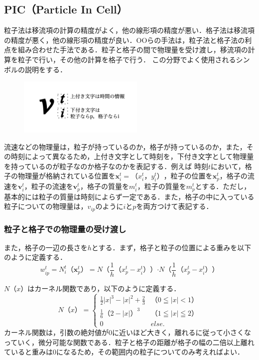 \documentclass[a4j,12pt]{jreport}
\begin{document}
\subsection{PIC（Particle In Cell）} \label{subsec:PIC}
粒子法は移流項の計算の精度がよく，他の線形項の精度が悪い．格子法は移流項の精度が悪く，他の線形項の精度が良い．OOらの手法は，粒子法と格子法の利点を組み合わせた手法である．粒子と格子の間で物理量を受け渡し，移流項の計算を粒子で行い，その他の計算を格子で行う．
この分野でよく使用されるシンボルの説明をする．
\begin{figure}[htbp]
\begin{center}
\includegraphics[width=60mm]{exp_simbol.png}
\end{center}
\end{figure}

流速などの物理量は，粒子が持っているのか，格子が持っているのか，また，その時刻によって異なるため，上付き文字として時刻を，下付き文字として物理量を持っているのが粒子なのか格子なのかを表記する．例えば
時刻$t$において，格子の物理量が格納されている位置を$\bm{x}^t_i = （x^t_i，y^t_i）$，粒子の位置を$\bm{x}^t_p$，格子の流速を$\bm{v}^t_i$，粒子の流速を$\bm{v}^t_p$，格子の質量を$m^t_i$，粒子の質量を$m^t_p$とする．ただし，基本的には粒子の質量は時刻によらず一定である．また，格子の中に入っている粒子についての物理量は，$v_{ip}$のように$iとp$を両方つけて表記する．
\subsubsection{粒子と格子での物理量の受け渡し} \label{subsec:P2GG2P}
また，格子の一辺の長さを$h$とする．まず，格子と粒子の位置による重みを以下のように定義する．
\begin{equation}\label{eq:weight}
w^t_{ip} = N^t_i（\bm{x}^t_p） = N（\frac{1}{h}（x^t_p - x^t_i））\boldsymbol{\cdot}N（\frac{1}{h}（x^t_p - x^t_i））
\end{equation} 

$N（x）$はカーネル関数であり，以下のように定義する．
\begin{equation}\label{eq:kernel}
N（x） = 
\begin{cases}
\frac{1}{2}|x|^3 - |x|^2 + \frac{2}{3} & （0\leqq|x|<1） \\
\frac{1}{6}（2-|x|）^3 & （1\leqq|x|\leqq2） \\
0 & else.
\end{cases}
\end{equation} 
カーネル関数は，引数の絶対値が0に近いほど大きく，離れるに従って小さくなっていく，微分可能な関数である．粒子と格子の距離が格子の幅の二倍以上離れていると重みは0になるため，その範囲内の粒子についてのみ考えればよい．
\end{document}
